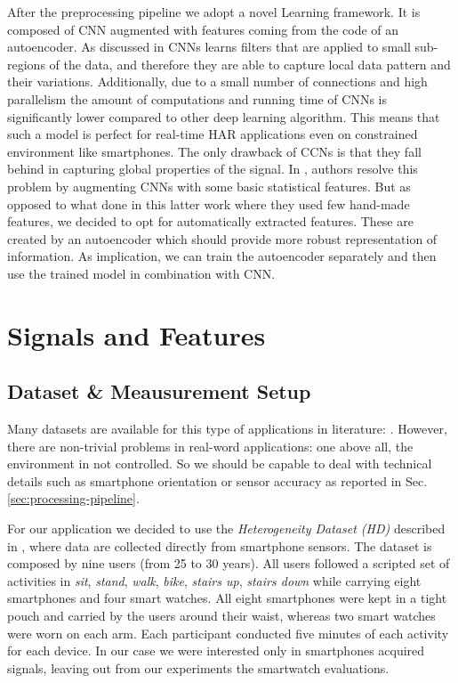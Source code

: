 After the preprocessing pipeline we adopt a novel Learning framework. It is composed of CNN augmented with features coming from the code of an autoencoder. As discussed in \cite{ignatov2018real} CNNs learns filters that are applied to small sub-regions of the data, and therefore they are able to capture local data pattern and their variations. Additionally, due to a small number of connections and high parallelism the amount of computations and running time of CNNs is significantly lower compared to other deep learning algorithm. This means that such a model is perfect for real-time HAR applications even on constrained environment like smartphones. The only drawback of CCNs is that they fall behind in capturing global properties of the signal. In \cite{ignatov2018real}, authors resolve this problem by augmenting CNNs with some basic statistical features. But as opposed to what done in this latter work where they used few hand-made features, we decided to opt for automatically extracted features. These are created by an autoencoder which should provide more robust representation of information. As implication, we can train the autoencoder separately and then use the trained model in combination with CNN.

\section{Signals and Features}
\label{sec:signals-and-features}

\subsection{Dataset \& Meausurement Setup}
\label{subsec:dataset-measurement-setup}

Many datasets are available for this type of applications in
literature: \cite{HETEROGENEITY, UCI, WISDM, EXTRASENSORY}.  However,
there are non-trivial problems in real-word applications: one above
all, the environment in not controlled. So we should be capable to
deal with technical details such as smartphone orientation or sensor
accuracy as reported in Sec. \ref{sec:processing-pipeline}.

For our application we decided to use the \textit{Heterogeneity
  Dataset (HD)} \cite{HETEROGENEITY} described in
\cite{stisen2015smart}, where data are collected directly from
smartphone sensors. The dataset is composed by nine users (from 25 to
30 years). All users followed a scripted set of activities in
\textit{sit}, \textit{stand}, \textit{walk}, \textit{bike},
\textit{stairs up}, \textit{stairs down} while carrying eight
smartphones and four smart watches. All eight smartphones were kept in
a tight pouch and carried by the users around their waist, whereas two
smart watches were worn on each arm. Each participant conducted five
minutes of each activity for each device. In our case we were
interested only in smartphones acquired signals, leaving out from our
experiments the smartwatch evaluations.


